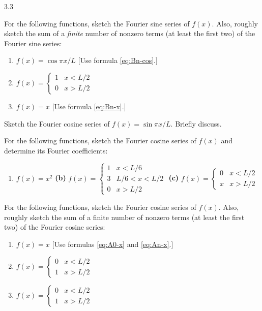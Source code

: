 \begin{exercises}{3.3}
\item For the following functions, sketch the Fourier sine series of $f(x)$.  Also, roughly sketch the sum of a \textit{finite} number of nonzero terms (at least the first two) of the Fourier sine series:
\begin{enumerate}
\item[\textbf{(a)}] $f(x) = \cos \pi x/L$ [Use formula \eqref{eq:Bn-cos}.]
\item[\textbf{(b)}] $f(x) = \begin{cases} 1 & x < L/2 \\ 0 & x > L/2 \end{cases}$
\item[\textbf{(c)}] $f(x) = x$ [Use formula \eqref{eq:Bn-x}.]
\end{enumerate}

\item Sketch the Fourier cosine series of $f(x) = \sin \pi x/L$.  Briefly discuss.

\item For the following functions, sketch the Fourier cosine series of $f(x)$ and determine its Fourier coefficients:
\begin{enumerate}
\item[\textbf{(a)}] $f(x) = x^2$ \hfill \textbf{(b)} $f(x) = \begin{cases} 1 & x < L/6 \\ 3 & L/6 < x < L/2 \\ 0 & x > L/2 \end{cases}$ \hfill \textbf{(c)} $f(x) = \begin{cases} 0 & x < L/2 \\ x & x > L/2 \end{cases}$
\end{enumerate}

\item For the following functions, sketch the Fourier cosine series of $f(x)$.  Also, roughly sketch the sum of a finite number of nonzero terms (at least the first two) of the Fourier cosine series:
\begin{enumerate}
\item[\textbf{(a)}] $f(x) = x$ [Use formulas \eqref{eq:A0-x} and \eqref{eq:An-x}.]
\item[\textbf{(b)}] $f(x) = \begin{cases} 0 & x < L/2 \\ 1 & x > L/2 \end{cases}$ 
\item[\textbf{(c)}] $f(x) = \begin{cases} 0 & x < L/2 \\ 1 & x > L/2 \end{cases}$ 
\end{enumerate}


\end{exercises}

